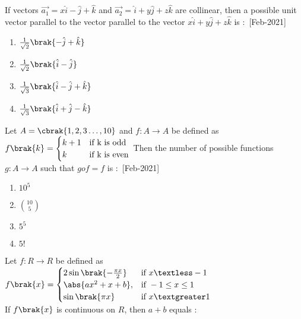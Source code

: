 \iffalse
\title{2021}
\author{EE24BTECH11021}
\section{mcq-single}
\fi
    \item If vectors $\overrightarrow{a_1}=x\hat{i}-\hat{j}+\hat{k}$ and $\overrightarrow{a_2}=\hat{i}+y\hat{j}+z\hat{k}$ are collinear, then a possible unit vector parallel to the vector parallel to the vector $x\hat{i}+y\hat{j}+z\hat{k}$ is $\colon$
    \hfill{[Feb-2021]}
        \begin{enumerate}
            \item $\frac{1}{\sqrt{2}}\brak{-\hat{j}+\hat{k}}$
            \item $\frac{1}{\sqrt{2}}\brak{\hat{i}-\hat{j}}$
            \item $\frac{1}{\sqrt{3}}\brak{\hat{i}-\hat{j}+\hat{k}}$
            \item $\frac{1}{\sqrt{3}}\brak{\hat{i}+\hat{j}-\hat{k}}$
        \end{enumerate}
    \item Let $A=\cbrak{1,2,3\dots,10}$ and $f\colon A\rightarrow A$ be defined as $f\brak{k}=
        \begin{cases}
            k+1 & \text{if  k is odd}\\
            k & \text{if  k is even}
        \end{cases}    
    $
    Then the number of possible functions $g\colon A\rightarrow A$ such that $gof=f$ is $\colon$
    \hfill{[Feb-2021]}
        \begin{enumerate}
            \item $10^5$
            \item $\binom{10}{5}$
            \item $5^5$
            \item $5!$
        \end{enumerate}
    \item Let $f\colon R\rightarrow R$ be defined as $f\brak{x}=
        \begin{cases}
            2\sin\brak{-\frac{\pi x}{2}} & \text{if } x\textless -1 \\
            \abs{ax^2+x+b}, & \text{if } -1\leq x\leq 1 \\
            \sin\brak{\pi x} & \text{if } x\textgreater 1
        \end{cases}
        $\\
        If $f\brak{x}$ is continuous on $R$, then $a+b$ equals $\colon$
